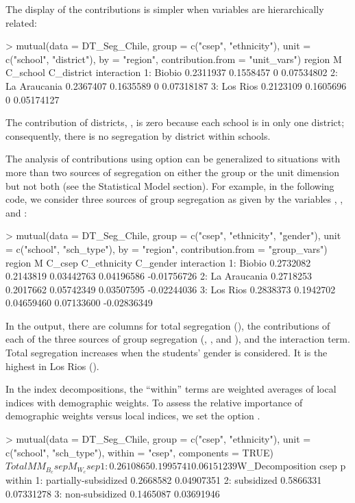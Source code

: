 The display of the contributions is simpler when variables are hierarchically related:
\begin{example}
> mutual(data = DT_Seg_Chile,
         group = c("csep", "ethnicity"),
         unit = c("school", "district"),
         by = "region",
         contribution.from = "unit_vars")
         region         M  C_school C_district interaction
1:       Biobio 0.2311937 0.1558457          0  0.07534802
2: La Araucania 0.2367407 0.1635589          0  0.07318187
3:     Los Rios 0.2123109 0.1605696          0  0.05174127
\end{example}
The contribution of districts, , is zero because each school is in only one district; consequently, there is no segregation by district within schools.

The analysis of contributions using option  can be generalized to situations with more than two sources of segregation on either the group or the unit dimension but not both (see the Statistical Model section). For example, in the following code, we consider three sources of group segregation as given by the variables , , and :
\begin{example}
> mutual(data = DT_Seg_Chile,
         group = c("csep", "ethnicity", "gender"),
         unit = c("school", "sch_type"),
         by = "region",
         contribution.from = "group_vars")
         region         M    C_csep C_ethnicity   C_gender interaction
1:       Biobio 0.2732082 0.2143819  0.03442763 0.04196586 -0.01756726
2: La Araucania 0.2718253 0.2017662  0.05742349 0.03507595 -0.02244036
3:     Los Rios 0.2838373 0.1942702  0.04659460 0.07133600 -0.02836349
\end{example}
In the output, there are columns for total segregation (), the contributions of each of the three sources of group segregation (, , and ), and the interaction term. Total segregation increases when the students' gender is considered. It is the highest in Los Rios ().

In the index decompositions, the ``within'' terms are weighted averages of local indices with demographic weights. To assess the relative importance of demographic weights versus local indices, we set the option .
\begin{example}
> mutual(data = DT_Seg_Chile,
         group = c("csep", "ethnicity"),
         unit = c("school", "sch_type"),
         within = "csep",
         components = TRUE)
$Total
           M  M_B_csep   M_W_csep
1: 0.2610865 0.1995741 0.06151239

$W_Decomposition
                   csep         p     within
1: partially-subsidized 0.2668582 0.04907351
2:           subsidized 0.5866331 0.07331278
3:       non-subsidized 0.1465087 0.03691946
\end{example}

